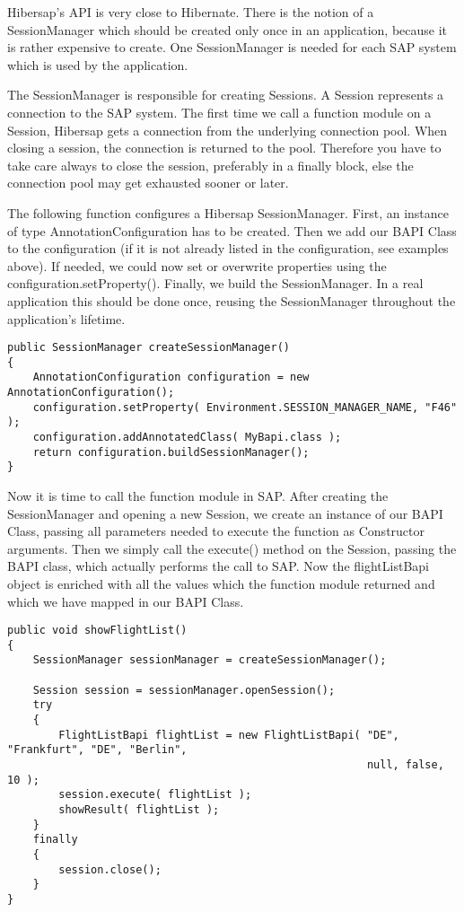 Hibersap's API is very close to Hibernate.
There is the notion of a SessionManager which should be created only once in an application,
because it is rather expensive to create.
One SessionManager is needed for each SAP system which is used by the application.

The SessionManager is responsible for creating Sessions.
A Session represents a connection to the SAP system. The first time we call a function module
on a Session, Hibersap gets a connection from the underlying connection pool.
When closing a session, the connection is returned to the pool. Therefore you have to take care
always to close the session, preferably in a finally block, else the connection pool may
get exhausted sooner or later.

The following function configures a Hibersap SessionManager.
First, an instance of type AnnotationConfiguration has to be created.
Then we add our BAPI Class to the configuration (if it is not already listed in the configuration, see examples above).
If needed, we could now set or overwrite properties using the configuration.setProperty().
Finally, we build the SessionManager.
In a real application this should be done once, reusing the SessionManager throughout the
application's lifetime.

\begin{Verbatim}[frame=single,label=Creating the SessionManager]
public SessionManager createSessionManager()
{
    AnnotationConfiguration configuration = new AnnotationConfiguration();
    configuration.setProperty( Environment.SESSION_MANAGER_NAME, "F46" );
    configuration.addAnnotatedClass( MyBapi.class );
    return configuration.buildSessionManager();
}
\end{Verbatim}

Now it is time to call the function module in SAP.
After creating the SessionManager and opening a new Session, we create an instance of our
BAPI Class, passing all parameters needed to execute the function as Constructor arguments.
Then we simply call the execute() method on the Session, passing the BAPI class,
which actually performs the call to SAP. Now the flightListBapi object is enriched with all the
values which the function module returned and which we have mapped in our BAPI Class.

\begin{Verbatim}[frame=single,label=Executing the function]
public void showFlightList()
{
    SessionManager sessionManager = createSessionManager();

    Session session = sessionManager.openSession();
    try
    {
        FlightListBapi flightList = new FlightListBapi( "DE", "Frankfurt", "DE", "Berlin", 
                                                        null, false, 10 );
        session.execute( flightList );
        showResult( flightList );
    }
    finally
    {
        session.close();
    }
}
\end{Verbatim}

